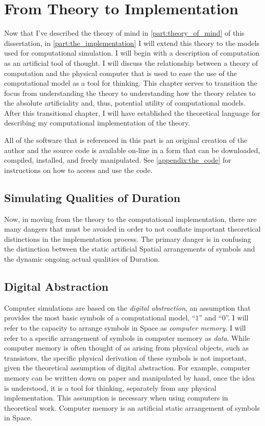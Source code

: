 \chapter{From Theory to Implementation}
\label{chapter:from_theory_to_implementation}

Now that I've described the theory of mind in
\autoref{part:theory_of_mind} of this dissertation, in
\autoref{part:the_implementation} I will extend this theory to the
models used for computational simulation.  I will begin with a
description of computation as an artificial tool of thought.  I will
discuss the relationship between a theory of computation and the
physical computer that is used to ease the use of the computational
model as a tool for thinking.  This chapter serves to transition the
focus from understanding the theory to understanding how the theory
relates to the absolute artificiality and, thus, potential utility of
computational models.  After this transitional chapter, I will have
established the theoretical language for describing my computational
implementation of the theory.

All of the software that is referenced in this part is an original
creation of the author and the source code is available on-line in a
form that can be downloaded, compiled, installed, and freely
manipulated.  See \autoref{appendix:the_code} for instructions on how
to access and use the code.

\section{Simulating Qualities of Duration}

Now, in moving from the theory to the computational implementation,
there are many dangers that must be avoided in order to not conflate
important theoretical distinctions in the implementation process.  The
primary danger is in confusing the distinction between the static
artificial Spatial arrangements of symbols and the dynamic ongoing
actual qualities of Duration.

\section{Digital Abstraction}

Computer simulations are based on the \emph{digital abstraction}, an
assumption that provides the most basic symbols of a computational
model, ``$1$'' and ``$0$''.  I will refer to the capacity to arrange
symbols in Space as \emph{computer memory}.  I will refer to a
specific arrangement of symbols in computer memory as \emph{data}.
While computer memory is often thought of as arising from physical
objects, such as transistors, the specific physical derivation of
these symbols is not important, given the theoretical assumption of
digital abstraction.  For example, computer memory can be written down
on paper and manipulated by hand, once the idea is understood, it is a
tool for thinking, separately from any physical implementation.  This
assumption is necessary when using computers in theoretical work.
Computer memory is an artificial static arrangement of symbols in
Space.

